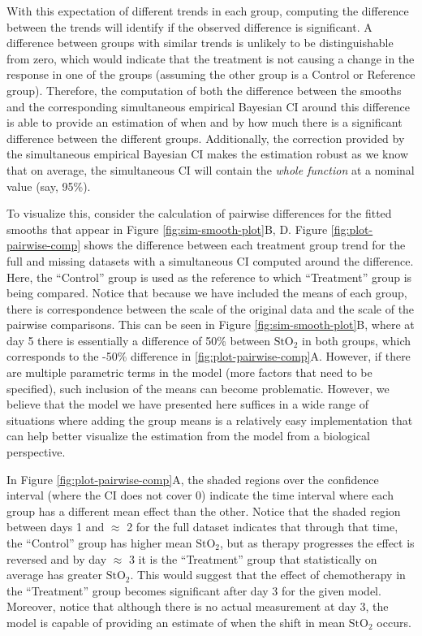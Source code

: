 \documentclass[
]{article}
\begin{document}
With this expectation of different trends in each group, computing the difference between the trends will identify if the observed difference is significant. A difference between groups with similar trends is unlikely to be distinguishable from zero, which would indicate that the treatment is not causing a change in the response in one of the groups (assuming the other group is a Control or Reference group). Therefore, the computation of both the difference between the smooths and the corresponding simultaneous empirical Bayesian CI around this difference is able to provide an estimation of when and by how much there is a significant difference between the different groups. Additionally, the correction provided by the simultaneous empirical Bayesian CI makes the estimation robust as we know that on average, the simultaneous CI will contain the \emph{whole function} at a nominal value (say, 95\%).

To visualize this, consider the calculation of pairwise differences for the fitted smooths that appear in Figure \ref{fig:sim-smooth-plot}B, D. Figure \ref{fig:plot-pairwise-comp} shows the difference between each treatment group trend for the full and missing datasets with a simultaneous CI computed around the difference. Here, the ``Control'' group is used as the reference to which ``Treatment'' group is being compared. Notice that because we have included the means of each group, there is correspondence between the scale of the original data and the scale of the pairwise comparisons. This can be seen in Figure \ref{fig:sim-smooth-plot}B, where at day 5 there is essentially a difference of 50\% between \(\mbox{StO}_2\) in both groups, which corresponds to the -50\% difference in \ref{fig:plot-pairwise-comp}A. However, if there are multiple parametric terms in the model (more factors that need to be specified), such inclusion of the means can become problematic. However, we believe that the model we have presented here suffices in a wide range of situations where adding the group means is a relatively easy implementation that can help better visualize the estimation from the model from a biological perspective.

In Figure \ref{fig:plot-pairwise-comp}A, the shaded regions over the confidence interval (where the CI does not cover 0) indicate the time interval where each group has a different mean effect than the other. Notice that the shaded region between days 1 and \(\approx\) 2 for the full dataset indicates that through that time, the ``Control'' group has higher mean \(\mbox{StO}_2\), but as therapy progresses the effect is reversed and by day \(\approx\) 3 it is the ``Treatment'' group that statistically on average has greater \(\mbox{StO}_2\). This would suggest that the effect of chemotherapy in the ``Treatment'' group becomes significant after day 3 for the given model. Moreover, notice that although there is no actual measurement at day 3, the model is capable of providing an estimate of when the shift in mean \(\mbox{StO}_2\) occurs.
\end{document}
